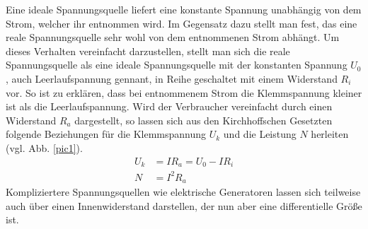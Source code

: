 Eine ideale Spannungsquelle liefert eine konstante Spannung unabhängig von dem Strom, welcher ihr
entnommen wird. Im Gegensatz dazu stellt man fest, das eine reale Spannungsquelle sehr wohl von 
dem entnommenen Strom abhängt. Um dieses Verhalten vereinfacht darzustellen, stellt man sich die
reale Spannungsquelle als eine ideale Spannungsquelle mit der konstanten Spannung $U_0$, auch 
Leerlaufspannung gennant, in Reihe 
geschaltet mit einem Widerstand $R_i$ vor. So ist zu erklären, dass bei entnommenem Strom die Klemmspannung
kleiner ist als die Leerlaufspannung. Wird der Verbraucher vereinfacht durch einen Widerstand $R_a$
dargestellt, so lassen sich aus den Kirchhoffschen Gesetzten folgende Beziehungen für die Klemmspannung
$U_k$ und die Leistung $N$ herleiten \cite{anleitung} (vgl. Abb. \ref{pic1}).
\begin{align}
U_k&=I R_a=U_0 - I R_i \label{equk} \\
N&=I^2 R_a \label{eqn}
\end{align}
Kompliziertere Spannungsquellen wie elektrische Generatoren lassen sich teilweise auch über einen
Innenwiderstand darstellen, der nun aber eine differentielle Größe ist.

\FloatBarrier


